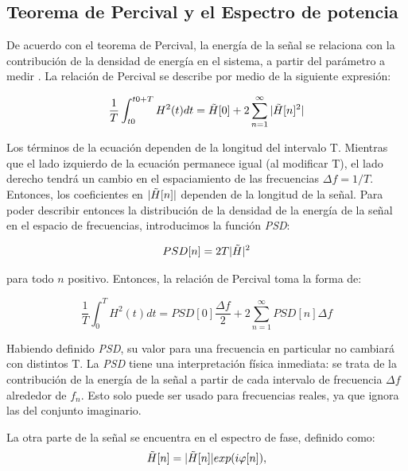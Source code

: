 \subsection{Teorema de Percival y el Espectro de potencia}
\label{psd_section}
De acuerdo con el teorema de Percival, la energía de la señal se relaciona con la contribución de la densidad de energía en el sistema, a partir del parámetro a medir \cite{book_analysis_Method_multiSp_data}. La relación de Percival se describe por medio de la siguiente expresión: 

\begin{equation}
    \frac{1}{T} \int_{t0}^{t0+T} H^2(t)dt = \Tilde{H}[0] + 2 \sum_{n=1}^\infty |\Tilde{H}[n]^2|
\end{equation}

Los términos de la ecuación dependen de la longitud del intervalo T. Mientras que el lado izquierdo de la ecuación permanece igual (al modificar T), el lado derecho tendrá un cambio en el espaciamiento de las frecuencias $\Delta f = 1/T$. Entonces, los coeficientes en $|\Tilde{H}[n]|$ dependen de la longitud de la señal. Para poder describir entonces la distribución de la densidad de la energía de la señal en el espacio de frecuencias, introducimos la función \emph{PSD}:

\begin{equation}
    PSD[n] = 2T |\Tilde{H}|^2
\end{equation}

para todo $n$ positivo. Entonces, la relación de Percival toma la forma de:

\begin{equation}
    \frac{1}{T} \int_0^T H^2 (t)dt = PSD[0] \frac{\Delta f}{2} +2 \sum_{n=1}^\infty PSD[n] \Delta f
\end{equation}

Habiendo definido \emph{PSD}, su valor para una frecuencia en particular no cambiará con distintos T. La \emph{PSD} tiene una interpretación física inmediata: se trata de la contribución de la energía de la señal a partir de cada intervalo de frecuencia $\Delta f$ alrededor de $f_n$. Esto solo puede ser usado para frecuencias reales, ya que ignora las del conjunto imaginario.
\vspace{1 em}

La otra parte de la señal se encuentra en el espectro de fase, definido como:
\begin{equation}
    \Tilde{H}[n] = |\Tilde{H}[n]| exp(i\varphi [n]), 
\end{equation}

